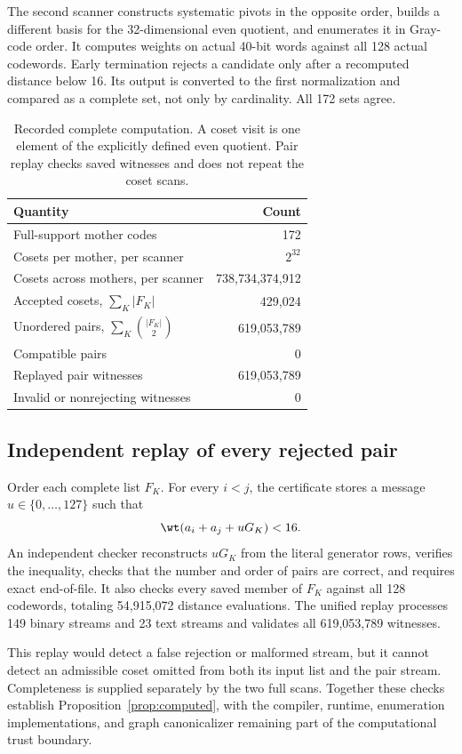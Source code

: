 The second scanner constructs systematic pivots in the opposite order, builds a different basis for the 32-dimensional even quotient, and enumerates it in Gray-code order. It computes weights on actual 40-bit words against all 128 actual codewords. Early termination rejects a candidate only after a recomputed distance below 16. Its output is converted to the first normalization and compared as a complete set, not only by cardinality. All 172 sets agree.

\begin{table}[t]
\caption{Recorded complete computation. A coset visit is one element of the explicitly defined even quotient. Pair replay checks saved witnesses and does not repeat the coset scans.}
\label{tab:compute}
\centering\small
\begin{tabular}{@{}lr@{}}
\toprule
Quantity & Count\\
\midrule
Full-support mother codes & 172\\
Cosets per mother, per scanner & $2^{32}$\\
Cosets across mothers, per scanner & 738,734,374,912\\
Accepted cosets, $\sum_K|F_K|$ & 429,024\\
Unordered pairs, $\sum_K\binom{|F_K|}{2}$ & 619,053,789\\
Compatible pairs & 0\\
Replayed pair witnesses & 619,053,789\\
Invalid or nonrejecting witnesses & 0\\
\bottomrule
\end{tabular}
\end{table}

\subsection{Independent replay of every rejected pair}
Order each complete list $F_K$. For every $i<j$, the certificate stores a message $u\in\{0,\ldots,127\}$ such that
\begin{equation}\label{eq:witness}
 \wt(a_i+a_j+uG_K)<16.
\end{equation}
An independent checker reconstructs $uG_K$ from the literal generator rows, verifies the inequality, checks that the number and order of pairs are correct, and requires exact end-of-file. It also checks every saved member of $F_K$ against all 128 codewords, totaling 54,915,072 distance evaluations. The unified replay processes 149 binary streams and 23 text streams and validates all 619,053,789 witnesses.

This replay would detect a false rejection or malformed stream, but it cannot detect an admissible coset omitted from both its input list and the pair stream. Completeness is supplied separately by the two full scans. Together these checks establish Proposition~\ref{prop:computed}, with the compiler, runtime, enumeration implementations, and graph canonicalizer remaining part of the computational trust boundary.
